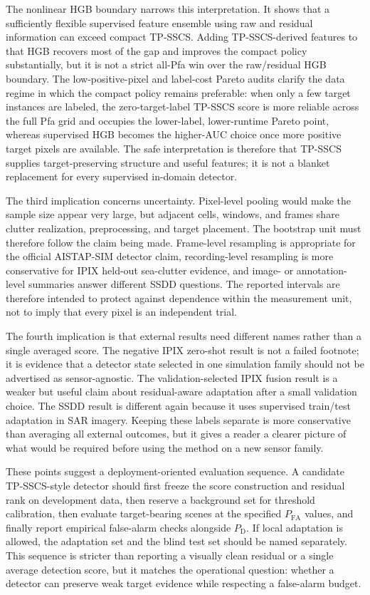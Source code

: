 \documentclass[journal]{IEEEtran}
\begin{document}
The nonlinear HGB boundary narrows this interpretation. It shows that a sufficiently flexible supervised feature ensemble using raw and residual information can exceed compact TP-SSCS. Adding TP-SSCS-derived features to that HGB recovers most of the gap and improves the compact policy substantially, but it is not a strict all-Pfa win over the raw/residual HGB boundary. The low-positive-pixel and label-cost Pareto audits clarify the data regime in which the compact policy remains preferable: when only a few target instances are labeled, the zero-target-label TP-SSCS score is more reliable across the full Pfa grid and occupies the lower-label, lower-runtime Pareto point, whereas supervised HGB becomes the higher-AUC choice once more positive target pixels are available. The safe interpretation is therefore that TP-SSCS supplies target-preserving structure and useful features; it is not a blanket replacement for every supervised in-domain detector.

The third implication concerns uncertainty. Pixel-level pooling would make the sample size appear very large, but adjacent cells, windows, and frames share clutter realization, preprocessing, and target placement. The bootstrap unit must therefore follow the claim being made. Frame-level resampling is appropriate for the official AISTAP-SIM detector claim, recording-level resampling is more conservative for IPIX held-out sea-clutter evidence, and image- or annotation-level summaries answer different SSDD questions. The reported intervals are therefore intended to protect against dependence within the measurement unit, not to imply that every pixel is an independent trial.

The fourth implication is that external results need different names rather than a single averaged score. The negative IPIX zero-shot result is not a failed footnote; it is evidence that a detector state selected in one simulation family should not be advertised as sensor-agnostic. The validation-selected IPIX fusion result is a weaker but useful claim about residual-aware adaptation after a small validation choice. The SSDD result is different again because it uses supervised train/test adaptation in SAR imagery. Keeping these labels separate is more conservative than averaging all external outcomes, but it gives a reader a clearer picture of what would be required before using the method on a new sensor family.

These points suggest a deployment-oriented evaluation sequence. A candidate TP-SSCS-style detector should first freeze the score construction and residual rank on development data, then reserve a background set for threshold calibration, then evaluate target-bearing scenes at the specified $P_{\mathrm{FA}}$ values, and finally report empirical false-alarm checks alongside $P_{\mathrm{D}}$. If local adaptation is allowed, the adaptation set and the blind test set should be named separately. This sequence is stricter than reporting a visually clean residual or a single average detection score, but it matches the operational question: whether a detector can preserve weak target evidence while respecting a false-alarm budget.
\end{document}
